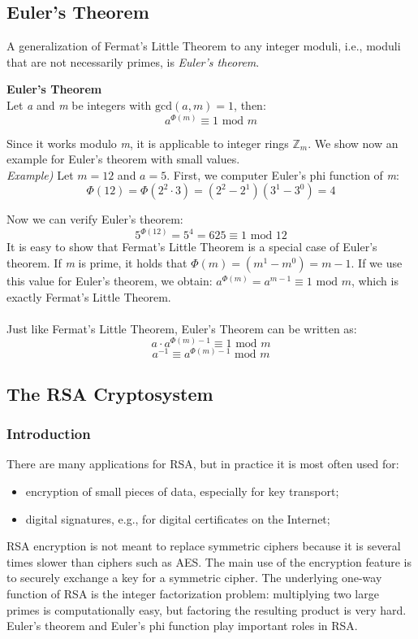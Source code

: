 \documentclass[11pt, a4paper]{article}
\newcommand{\mymod}{
    \text{ mod }
}
\begin{document}
\subsection{Euler's Theorem}
A generalization of Fermat's Little Theorem to any integer moduli, i.e., moduli that are not necessarily primes, is \textit{Euler's theorem}.
\begin{center}\begin{framed}
    \hfill\break\textbf{Euler's Theorem}\\
    Let \textit{a} and \textit{m} be integers with $\text{gcd}(\textit{a},\textit{m})=1$, then:
    $$a^{\Phi(m)}\equiv1\mymod m$$
\end{framed}\end{center}
Since it works modulo \textit{m}, it is applicable to integer rings $\mathbb{Z}_m$. We show now an example for Euler's theorem with small values.\\

\textit{Example)} Let $m=12$ and $a=5$. First, we computer Euler's phi function of \textit{m}:
$$\Phi(12)=\Phi(2^2\cdot3)=(2^2-2^1)(3^1-3^0)=4$$

Now we can verify Euler's theorem:
$$5^{\Phi(12)}=5^4=625\equiv1\mymod12$$
It is easy to show that Fermat's Little Theorem is a special case of Euler's theorem. If \textit{m} is prime, it holds that $\Phi(m)=(m^1-m^0)=m-1$. If we use this value for Euler's theorem, we obtain: $a^{\Phi(m)}=a^{m-1}\equiv1\mymod m$, which is exactly Fermat's Little Theorem.\\\\
Just like Fermat's Little Theorem, Euler's Theorem can be written as:
$$a\cdot a^{\Phi(m)-1}\equiv1\mymod m$$
$$a^{-1}\equiv a^{\Phi(m)-1}\mymod m$$

\newpage
\subsection{The RSA Cryptosystem}
\subsubsection{Introduction}
There are many applications for RSA, but in practice it is most often used for:
\begin{itemize}
    \item encryption of small pieces of data, especially for key transport;
    \item digital signatures, e.g., for digital certificates on the Internet;
\end{itemize}
RSA encryption is not meant to replace symmetric ciphers because it is several times slower than ciphers such as AES. The main use of the encryption feature is to securely exchange a key for a symmetric cipher. The underlying one-way function of RSA is the integer factorization problem: multiplying two large primes is computationally easy, but factoring the resulting product is very hard. Euler's theorem and Euler's phi function play important roles in RSA.
\end{document}
